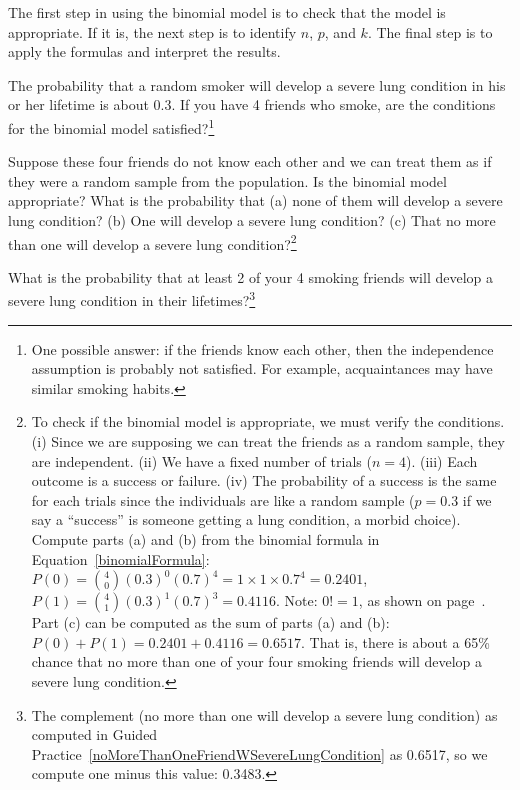 \begin{tipBox}{
The first step in using the binomial model is to check that the model is appropriate. If it is, the next step is to identify $n$, $p$, and $k$. The final step is to apply the formulas and interpret the results.}
\end{tipBox}

\begin{exercise}
The probability that a random smoker will develop a severe lung condition in his or her lifetime is about $0.3$. If you have 4 friends who smoke, are the conditions for the binomial model satisfied?\footnote{One possible answer: if the friends know each other, then the independence assumption is probably not satisfied. For example, acquaintances may have similar smoking habits.}
\end{exercise}

\begin{exercise}
\label{noMoreThanOneFriendWSevereLungCondition}%
Suppose these four friends do not know each other and we can treat them as if they were a random sample from the population. Is the binomial model appropriate? What is the probability that (a) none of them will develop a severe lung condition? (b) One will develop a severe lung condition? (c) That no more than one will develop a severe lung condition?\footnote{To check if the binomial model is appropriate, we must verify the conditions. (i) Since we are supposing we can treat the friends as a random sample, they are independent. (ii) We have a fixed number of trials ($n=4$). (iii) Each outcome is a success or failure. (iv) The probability of a success is the same for each trials since the individuals are like a random sample ($p=0.3$ if we say a ``success'' is someone getting a lung condition, a morbid choice). Compute parts (a) and (b) from the binomial formula in Equation~\eqref{binomialFormula}: $P(0) =  {4 \choose 0} (0.3)^0 (0.7)^4 = 1\times1\times0.7^4 = 0.2401$, $P(1) = {4 \choose 1} (0.3)^1(0.7)^{3} = 0.4116$. Note: $0!=1$, as shown on page~\pageref{zeroFactorial}. Part (c) can be computed as the sum of parts (a) and (b): $P(0) + P(1) = 0.2401 + 0.4116 = 0.6517$. That is, there is about a 65\% chance that no more than one of your four smoking friends will develop a severe lung condition.}
\end{exercise}

\begin{exercise}
What is the probability that at least 2 of your 4 smoking friends will develop a severe lung condition in their lifetimes?\footnote{The complement (no more than one will develop a severe lung condition) as computed in Guided Practice~\ref{noMoreThanOneFriendWSevereLungCondition} as 0.6517, so we compute one minus this value: 0.3483.}
\end{exercise}

